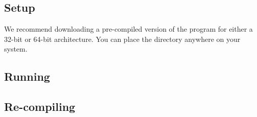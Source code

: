 \subsection{Setup}

We recommend downloading a pre-compiled version of the program for either a 32-bit or 64-bit architecture. You can place the \prog directory anywhere on your system. 

\subsection{Running}

\subsection{Re-compiling}






